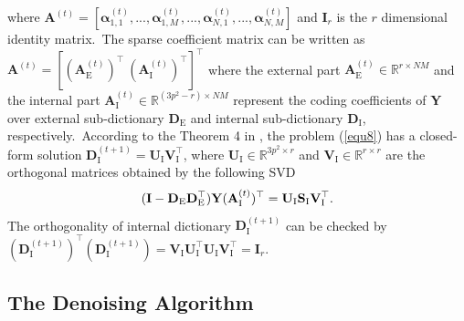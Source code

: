 \documentclass[10pt,twocolumn,letterpaper]{article}
\begin{document}
where $\textbf{A}^{(t)}=[\bm{\alpha}_{1,1}^{(t)},...,\bm{\alpha}_{1,M}^{(t)},...,\bm{\alpha}_{N,1}^{(t)},...,\bm{\alpha}_{N,M}^{(t)}]$ and $\mathbf{I}_{r}$ is the $r$ dimensional identity matrix.\ The sparse coefficient matrix can be written as $\mathbf{A}^{(t)}=[(\mathbf{A}_{\text{E}}^{(t)})^{\top}\ (\mathbf{A}_{\text{I}}^{(t)})^{\top}]^{\top}$ where the external part $\mathbf{A}_{\text{E}}^{(t)}\in\mathbb{R}^{r\times NM}$ and the internal part $\mathbf{A}_{\text{I}}^{(t)}\in\mathbb{R}^{(3p^2-r)\times NM}$ represent the coding coefficients of $\mathbf{Y}$ over external sub-dictionary $\mathbf{D}_{\text{E}}$ and internal sub-dictionary $\mathbf{D}_{\text{I}}$, respectively.\ According to the Theorem 4 in \cite{spca}, the problem (\ref{equ8}) has a closed-form solution $\mathbf{D}_{\text{I}}^{(t+1)}=\mathbf{U}_{\text{I}}\mathbf{V}_{\text{I}}^{\top}$, where $\mathbf{U}_{\text{I}}\in\mathbb{R}^{3p^2\times r}$ and $\mathbf{V}_{\text{I}}\in\mathbb{R}^{r\times r}$ are the orthogonal matrices obtained by the following SVD
\vspace{-1mm}
\begin{equation}\label{equ9}\vspace{-1mm}
(\mathbf{I}-\mathbf{D}_{\text{E}}\mathbf{D}_{\text{E}}^{\top})\mathbf{Y}(\mathbf{A}_{\text{I}}^{(t)})^{\top}
=
\mathbf{U}_{\text{I}}\mathbf{S}_{\text{I}}\mathbf{V}_{\text{I}}^{\top}.
\end{equation}
The orthogonality of internal dictionary $\mathbf{D}_{\text{I}}^{(t+1)}$ can be checked by 
$(\mathbf{D}_{\text{I}}^{(t+1)})^{\top}(\mathbf{D}_{\text{I}}^{(t+1)})=\mathbf{V}_{\text{I}}\mathbf{U}_{\text{I}}^{\top}\mathbf{U}_{\text{I}}\mathbf{V}_{\text{I}}^{\top}=\mathbf{I}_{r}$. 


\subsection{The Denoising Algorithm}
\end{document}
